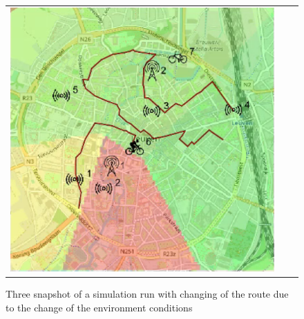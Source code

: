 \begin{figure}[h]
\begin{tabular}{lll}
         \includegraphics[scale=0.42]{figures/sim1snap3.png} 
    \end{tabular}
    \caption{Three snapshot of a simulation run with changing of the route due to the change of the environment conditions}
    \label{fig:sim1}
\end{figure}
% 

